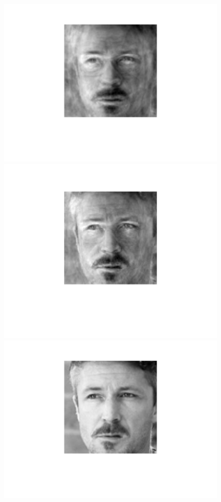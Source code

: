 \begin{figure}[ht!]
\begin{minipage}{0.19\textwidth}
    \includegraphics[width = 1\textwidth]{fig/petyr_95.png}
    \end{minipage}
     \begin{minipage}{0.19\textwidth}
    \includegraphics[width = 1\textwidth]{fig/petyr_99.png}
    \end{minipage}
     \begin{minipage}{0.19\textwidth}
    \includegraphics[width = 1\textwidth]{fig/petyr_100.png}

\end{minipage}
\end{figure}
